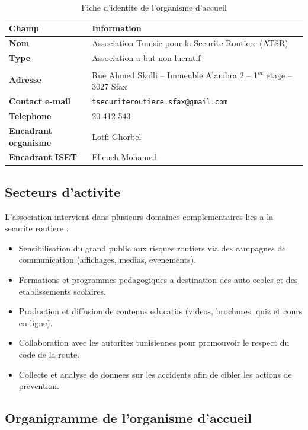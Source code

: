 \documentclass[a4paper,12pt]{report}
\begin{document}
\begin{table}[H]
  \centering
  \caption{Fiche d'identite de l'organisme d'accueil}
  \label{tab:organisme}
  \begin{tabularx}{\textwidth}{>{\bfseries}p{4.5cm} X}
    \toprule
    Champ & Information \\
    \midrule
    Nom & Association Tunisie pour la Securite Routiere (ATSR) \\
    Type & Association a but non lucratif \\
    Adresse & Rue Ahmed Skolli -- Immeuble Alambra 2 -- 1\textsuperscript{er} etage -- 3027 Sfax \\
    Contact e-mail & \texttt{tsecuriteroutiere.sfax@gmail.com} \\
    Telephone & 20 412 543 \\
    Encadrant organisme & Lotfi Ghorbel \\
    Encadrant ISET & Elleuch Mohamed \\
    \bottomrule
  \end{tabularx}
\end{table}

    \subsection{Secteurs d'activite}

    L'association intervient dans plusieurs domaines complementaires lies a la
    securite routiere :

    \begin{itemize}
      \item Sensibilisation du grand public aux risques routiers via des campagnes
        de communication (affichages, medias, evenements).
      \item Formations et programmes pedagogiques a destination des auto-ecoles
        et des etablissements scolaires.
      \item Production et diffusion de contenus educatifs (videos, brochures,
        quiz et cours en ligne).
      \item Collaboration avec les autorites tunisiennes pour promouvoir le respect
        du code de la route.
      \item Collecte et analyse de donnees sur les accidents afin de cibler
        les actions de prevention.
    \end{itemize}

    \subsection{Organigramme de l'organisme d'accueil}
\end{document}
